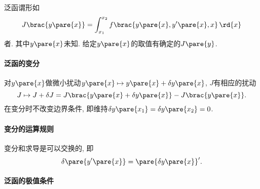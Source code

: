 \documentclass{ctexart}
\begin{document}
泛函谓形如
\[ J\brac{y\pare{x}} = \int_{x_1}^{x_2} f\brac{y\pare{x},y'\pare{x},x}\,\rd{x} \]
者. 其中$y\pare{x}$未知. 给定$y\pare{x}$的取值有确定的$J\pare{y}$.


\paragraph{泛函的变分} %
\label{par:泛函的变分}

对$y\pare{x}$做微小扰动$y\pare{x}\mapsto y\pare{x} + \delta y\pare{x}$, $J$有相应的扰动
\[ J\mapsto J+\delta J = J\brac{y\pare{x} + \delta y\pare{x}} - J\brac{y\pare{x}}. \]
在变分时不改变边界条件, 即维持$\delta y\pare{x_1} = \delta y\pare{x_2} = 0$.


\paragraph{变分的运算规则} %
\label{par:变分的运算规则}

变分和求导是可以交换的, 即
\[ \delta \pare{y'\pare{x}} = \pare{\delta y\pare{x}}'. \]


\paragraph{泛函的极值条件} %
\label{par:泛函的极值条件}
\end{document}
